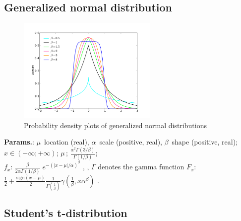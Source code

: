     
        
\subsection{Generalized normal distribution}


    \begin{figure}[H]
        \centering
        \includegraphics[width=0.6\textwidth]{images/Generalized normal densities.png}
        \caption{Probability density plots of generalized normal distributions}
    \end{figure}




    {\color{darkblue} \textbf{Params.}:} {$ \mu \,$ location (real),  $ \alpha \,$ scale (positive, real),  $ \beta \,$ shape (positive, real)}; {$x \in (-\infty; +\infty)\!$}; {$ \mu \,$}; {$\frac{\alpha^2\Gamma(3/\beta)}{\Gamma(1/\beta)}$};\hspace{0.5cm}\\{\color{darkblue} \textbf{$f_x$}:} {$\frac{\beta}{2\alpha\Gamma(1/\beta)} \; e^{-(|x-\mu|/\alpha)^\beta}$ , ,  $\Gamma$ denotes the gamma function}{\color{darkblue} \textbf{$F_x$}:} {$\frac{1}{2}+ \frac{\text{sign}(x - \mu)}{2} \frac{1}{\Gamma \left(\frac{1}{\beta}\right)} \gamma\left(\frac{1}{\beta}, x \alpha^\beta\right)$ .}



    
        
\subsection{Student's t-distribution}


